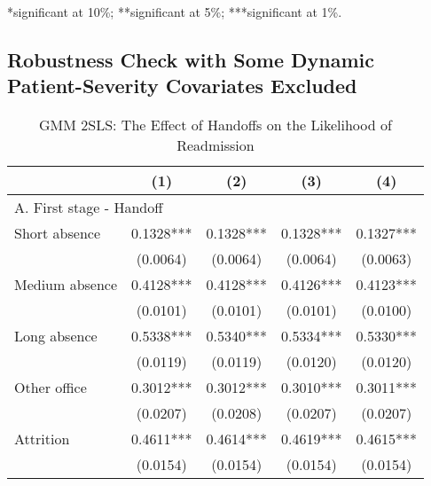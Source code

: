 \documentclass[final,12pt, notitlepage]{article}
\begin{document}
\begin{singlespace}
\begin{table}[H]
\begin{threeparttable}
\begin{tablenotes}
	*significant at 10\%; **significant at 5\%; ***significant at 1\%.
	\end{tablenotes}
\end{threeparttable}
\end{table}


\subsection{Robustness Check with Some Dynamic Patient-Severity Covariates Excluded} \label{appendix:iv_noendog}

\clearpage
\begin{table}[H]
\footnotesize
\setlength\tabcolsep{0pt}
\centering
\caption{GMM 2SLS: The Effect of Handoffs on the Likelihood of Readmission}
\label{tab:iv_noendog}
\begin{threeparttable}
{
\def\sym#1{\ifmmode^{#1}\else\(^{#1}\)\fi}
\begin{tabular*}{\textwidth}{l@{\extracolsep{\fill}}*{4}{c}} %
\toprule
                    &\multicolumn{1}{c}{(1)}&\multicolumn{1}{c}{(2)}&\multicolumn{1}{c}{(3)}&\multicolumn{1}{c}{(4)}\\
\midrule
\multicolumn{5}{l}{A. First stage - Handoff} \\
Short absence       &      0.1328***&      0.1328***&      0.1328***&      0.1327***\\
                    &    (0.0064)   &    (0.0064)   &    (0.0064)   &    (0.0063)   \\
Medium absence      &      0.4128***&      0.4128***&      0.4126***&      0.4123***\\
                    &    (0.0101)   &    (0.0101)   &    (0.0101)   &    (0.0100)   \\
Long absence        &      0.5338***&      0.5340***&      0.5334***&      0.5330***\\
                    &    (0.0119)   &    (0.0119)   &    (0.0120)   &    (0.0120)   \\
Other office        &      0.3012***&      0.3012***&      0.3010***&      0.3011***\\
                    &    (0.0207)   &    (0.0208)   &    (0.0207)   &    (0.0207)   \\
Attrition           &      0.4611***&      0.4614***&      0.4619***&      0.4615***\\
                    &    (0.0154)   &    (0.0154)   &    (0.0154)   &    (0.0154)   \\

\end{tabular*}}
\end{threeparttable}
\end{table}
\end{singlespace}
\end{document}
